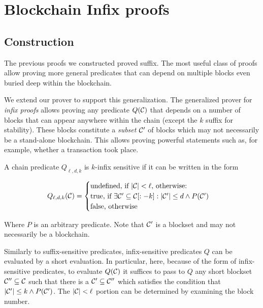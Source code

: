 \section{Blockchain Infix proofs}

\label{sec:infix}

\subsection{Construction}

The previous proofs we constructed proved suffix. The most useful class of
proofs allow proving more general predicates that can depend on multiple blocks
even buried deep within the blockchain.

We extend our prover to support this generalization. The generalized prover for
\textit{infix proofs} allows proving any predicate $Q(\mathcal{C})$ that depends on a
number of blocks that can appear anywhere within the chain (except the $k$
suffix for stability). These blocks constitute a \textit{subset} $\mathcal{C}'$ of
blocks which may not necessarily be a stand-alone blockchain. This allows
proving powerful statements such as, for example, whether a transaction took
place.

\begin{definition}
A chain predicate $Q_{\ell,d,k}$ is $k$-\textnormal{infix sensitive} if it can be
written in the form

$$
Q_{\ell,d,k}(\mathcal{C}) =
\begin{cases}
  \text{undefined, if } |\mathcal{C}| < \ell \text{, otherwise:}\\
  \text{true, if }
    \exists \mathcal{C}' \subseteq \mathcal{C}[:-k]: |\mathcal{C}'| \leq d \land P(\mathcal{C}')\\
  \text{false, otherwise}
\end{cases}
$$

Where $P$ is an arbitrary predicate. Note that $\mathcal{C}'$ is a blockset and may
not necessarily be a blockchain.
\end{definition}

Similarly to suffix-sensitive predicates, infix-sensitive predicates $Q$ can be
evaluated by a short evaluation. In particular, here, because of the form of
infix-sensitive predicates, to evaluate $Q(\mathcal{C})$ it suffices to pass to $Q$
any short blockset $\mathcal{C}'' \subseteq \mathcal{C}$ such that there is a $\mathcal{C}'
\subseteq \mathcal{C}''$ which satisfies the condition that $|\mathcal{C}'| \leq k \land
P(\mathcal{C}')$. The $|\mathcal{C}| < \ell$ portion can be determined by examining the
block number.

